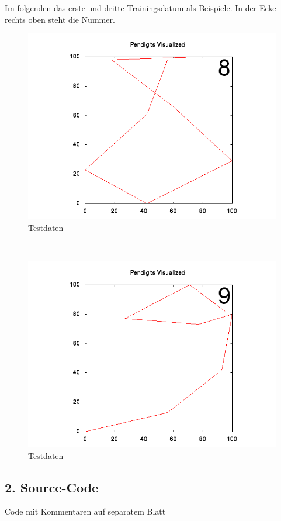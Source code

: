 \documentclass{article}
\begin{document}
			Im folgenden das erste und dritte Trainingsdatum als Beispiele. In der Ecke rechts oben steht die Nummer.
			\begin{figure}[h!]
 			   \centering
			    \includegraphics[scale=0.3,bb=0 0 640 480]{pendigit-testing1.png}
			    \caption{Testdaten}
			    \label{picture-label}
			 \end{figure}\\
			\begin{figure}[h!]
 			   \centering
			    \includegraphics[scale=0.3,bb=0 0 640 480]{pendigit-testing3.png}
			    \caption{Testdaten}
			    \label{picture-label}
			 \end{figure}
		
		\subsection*{2. Source-Code}
			Code mit Kommentaren auf separatem Blatt
		
\end{document}
